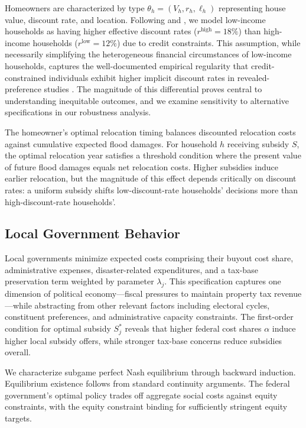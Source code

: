 \documentclass[12pt,a4paper]{article}
\begin{document}
Homeowners are characterized by type $\theta_h = (V_h, r_h, \ell_h)$ representing house value, discount rate, and location. Following \citet{warner2001personal} and \citet{bier2019game}, we model low-income households as having higher effective discount rates ($r^{\text{high}} = 18\%$) than high-income households ($r^{\text{low}} = 12\%$) due to credit constraints. This assumption, while necessarily simplifying the heterogeneous financial circumstances of low-income households, captures the well-documented empirical regularity that credit-constrained individuals exhibit higher implicit discount rates in revealed-preference studies \citep{hausman1979individual, frederick2002time}. The magnitude of this differential proves central to understanding inequitable outcomes, and we examine sensitivity to alternative specifications in our robustness analysis.

The homeowner's optimal relocation timing balances discounted relocation costs against cumulative expected flood damages. For household $h$ receiving subsidy $S$, the optimal relocation year satisfies a threshold condition where the present value of future flood damages equals net relocation costs. Higher subsidies induce earlier relocation, but the magnitude of this effect depends critically on discount rates: a uniform subsidy shifts low-discount-rate households' decisions more than high-discount-rate households'.

\subsection{Local Government Behavior}

Local governments minimize expected costs comprising their buyout cost share, administrative expenses, disaster-related expenditures, and a tax-base preservation term weighted by parameter $\lambda_j$. This specification captures one dimension of political economy---fiscal pressures to maintain property tax revenue---while abstracting from other relevant factors including electoral cycles, constituent preferences, and administrative capacity constraints. The first-order condition for optimal subsidy $S_j^*$ reveals that higher federal cost shares $\alpha$ induce higher local subsidy offers, while stronger tax-base concerns reduce subsidies overall.

We characterize subgame perfect Nash equilibrium through backward induction. Equilibrium existence follows from standard continuity arguments. The federal government's optimal policy trades off aggregate social costs against equity constraints, with the equity constraint binding for sufficiently stringent equity targets.
\end{document}
